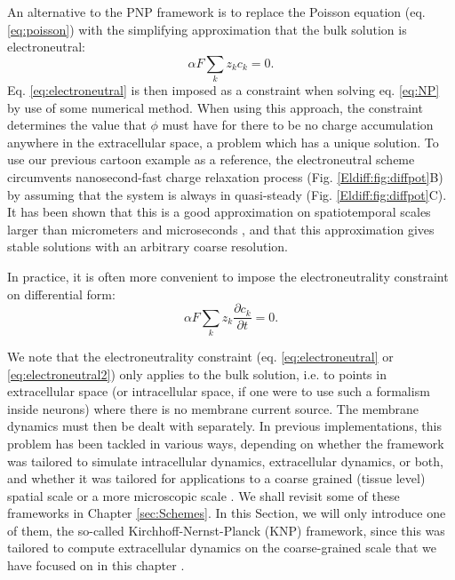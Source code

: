 \subsubsection{}
An alternative to the PNP framework is to replace the Poisson equation (eq. \ref{eq:poisson}) with the simplifying approximation that the bulk solution is electroneutral:
\begin{equation}
\alpha F \sum_k z_k c_k = 0.
\label{eq:electroneutral}
\end{equation}
Eq. \ref{eq:electroneutral} is then imposed as a constraint when solving eq. \ref{eq:NP} by use of some numerical method. When using this approach, the constraint determines the value that $\phi$ must have for there to be no charge accumulation anywhere in the extracellular space, a problem which has a unique solution. To use our previous cartoon example as a reference, the electroneutral scheme circumvents nanosecond-fast charge relaxation process (Fig. \ref{Eldiff:fig:diffpot}B) by assuming that the system is always in quasi-steady (Fig. \ref{Eldiff:fig:diffpot}C). It has been shown that this is a good approximation on spatiotemporal scales larger than micrometers and microseconds \citep{Grodzinsky2011, Pods2017, Solbra2018}, and that this approximation gives stable solutions with an arbitrary coarse resolution.

In practice, it is often more convenient to impose the electroneutrality constraint on differential form:
\begin{equation}
\alpha F \sum_k{z_k \frac{\partial c_k}{\partial t}} = 0.
\label{eq:electroneutral2}
\end{equation}

We note that the electroneutrality constraint (eq. \ref{eq:electroneutral} or \ref{eq:electroneutral2}) only applies to the bulk solution, i.e. to points in extracellular space (or intracellular space, if one were to use such a formalism inside neurons) where there is no membrane current source. The membrane dynamics must then be dealt with separately. In previous implementations, this problem has been tackled in various ways, depending on whether the framework was tailored to simulate intracellular dynamics, extracellular dynamics, or both, and whether it was tailored for applications to a coarse grained (tissue level) spatial scale or a more microscopic scale \citep{Qian1989, Mori2008, Mori2009, Mori2009a, Mori2011, Halnes2015, Halnes2013, Pods2017, Niederer2013, OConnell2016, Solbra2018, tuttle2019, ellingsrud2020}. We shall revisit some of these frameworks in Chapter \ref{sec:Schemes}. In this Section, we will only introduce one of them, the so-called Kirchhoff-Nernst-Planck (KNP) framework, since this was tailored to compute extracellular dynamics on the coarse-grained scale that we have focused on in this chapter \citep{Solbra2018}.


